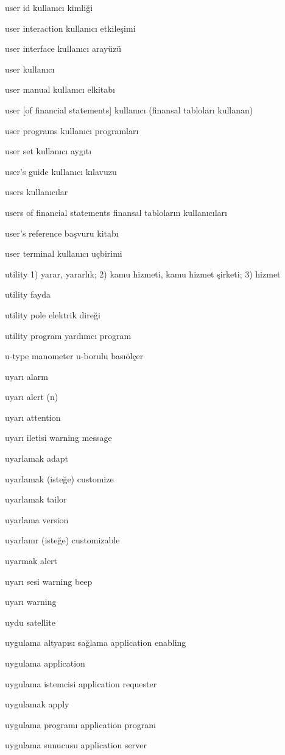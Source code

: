 \documentclass[12pt,fleqn]{article}\usepackage{../../common}
\begin{document}
user id kullanıcı kimliği

user interaction kullanıcı etkileşimi

user interface kullanıcı arayüzü

user kullanıcı

user manual kullanıcı elkitabı

user [of financial statements] kullanıcı (finansal tabloları kullanan)

user programs kullanıcı programları

user set kullanıcı aygıtı

user's guide kullanıcı kılavuzu

users kullanıcılar

users of financial statements finansal tabloların kullanıcıları

user's reference başvuru kitabı

user terminal kullanıcı uçbirimi

utility 1) yarar, yararlık; 2) kamu hizmeti, kamu hizmet şirketi; 3) hizmet

utility fayda

utility pole elektrik direği

utility program yardımcı program

u-type manometer u-borulu basıölçer

uyarı alarm

uyarı alert (n)

uyarı attention

uyarı iletisi warning message

uyarlamak adapt

uyarlamak (isteğe) customize

uyarlamak tailor

uyarlama version

uyarlanır (isteğe) customizable

uyarmak alert

uyarı sesi warning beep

uyarı warning

uydu satellite

uygulama altyapısı sağlama application enabling

uygulama application

uygulama istemcisi application requester

uygulamak apply

uygulama programı application program

uygulama sunucusu application server
\end{document}
